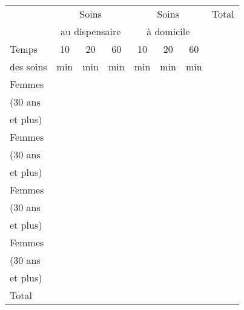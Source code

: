 

\begin{tabular}{|@{\ }l@{\ }|@{\ }c@{\ }|@{\ }c@{\ }|@{\ }c@{\ }|@{\ }c@{\ }|@{\ }c@{\ }|@{\ }c@{\ }|@{\ }c@{\ }|}
	\hline
			& \multicolumn{3}{c|}{Soins} 			& \multicolumn{3}{c|}{Soins} 		&  Total\\
			& \multicolumn{3}{c|}{au dispensaire}   & \multicolumn{3}{c|}{à domicile} 	&  \\ \hline
Temps		&  10    	&  20      	&   60    	& 10    &  20     &   60			&  \\
des soins	&  min   	&  min      &     min  	& min   &  min    &     min  		&  \\ \hline
Femmes		&	     	&     		&       	&       &         &       			&  \\
(30 ans		&	     	&     		&       	&       &         &       			&   \\
et plus)	&	     	&     		&       	&       &         &       			&   \\ \hline
Femmes		&	     	&     		&       	&       &         &       			&  \\
(30 ans		&	     	&     		&       	&       &         &       			&   \\
et plus)	&	     	&     		&       	&       &         &       			&   \\ \hline%
Femmes		&	     	&     		&       	&       &         &       			&  \\
(30 ans		&	     	&     		&       	&       &         &       			&   \\
et plus)	&	     	&     		&       	&       &         &       			&   \\ \hline
Femmes		&	     	&     		&       	&       &         &       			&  \\
(30 ans		&	     	&     		&       	&       &         &       			&   \\
et plus)	&	     	&     		&       	&       &         &       			&   \\ \hline%
Total		&        &          &       			&       &         &       			&  \\ \hline
\end{tabular}